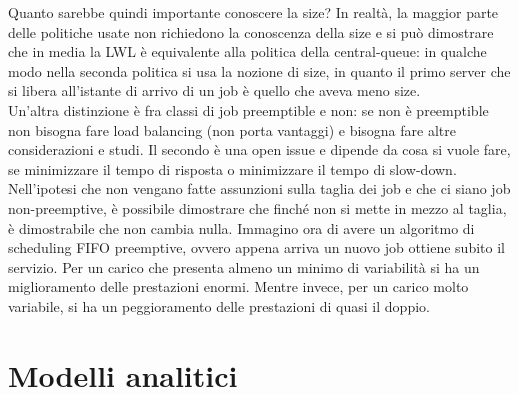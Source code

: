 \documentclass{article}
\begin{document}
Quanto sarebbe quindi importante conoscere la size? In realtà, la maggior parte delle politiche usate non richiedono la conoscenza della size e si può dimostrare che in media la LWL è equivalente alla politica della central-queue: in qualche modo nella seconda politica si usa la nozione di size, in quanto il primo server che si libera all'istante di arrivo di un job è quello che aveva meno size.\\ Un'altra distinzione è fra classi di job preemptible e non: se non è preemptible non bisogna fare load balancing (non porta vantaggi) e bisogna fare altre considerazioni e studi. Il secondo è una open issue e dipende da cosa si vuole fare, se minimizzare il tempo di risposta o minimizzare il tempo di slow-down.\\ Nell'ipotesi che non vengano fatte assunzioni sulla taglia dei job e che ci siano job non-preemptive, è possibile dimostrare che finché non si mette in mezzo al taglia, è dimostrabile che non cambia nulla. Immagino ora di avere un algoritmo di scheduling FIFO preemptive, ovvero appena arriva un nuovo job ottiene subito il servizio. Per un carico che presenta almeno un minimo di variabilità si ha un miglioramento delle prestazioni enormi. Mentre invece, per un carico molto variabile, si ha un peggioramento delle prestazioni di quasi il doppio.
\section{Modelli analitici}
\end{document}
